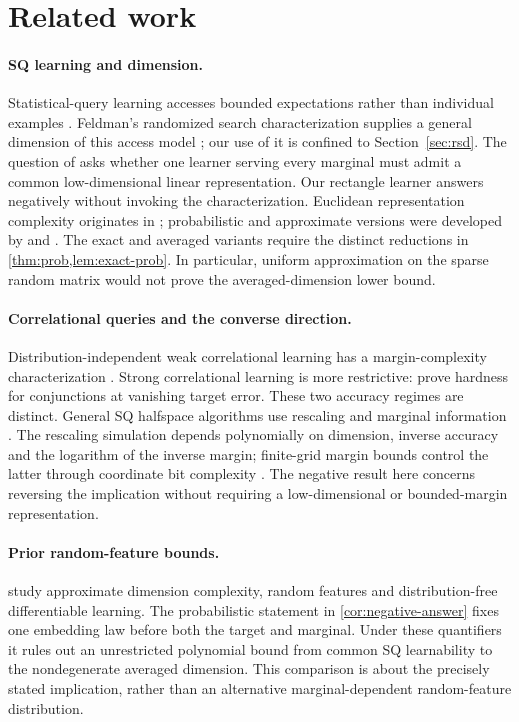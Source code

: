 \section{Related work}\label{sec:related}
\paragraph{SQ learning and dimension.}
Statistical-query learning accesses bounded expectations rather than individual examples \citep{Kearns98}. Feldman's randomized search characterization supplies a general dimension of this access model \citep{Feldman17}; our use of it is confined to Section~\ref{sec:rsd}. The question of \citet{FKS26} asks whether one learner serving every marginal must admit a common low-dimensional linear representation. Our rectangle learner answers negatively without invoking the characterization. Euclidean representation complexity originates in \citet{BDES02}; probabilistic and approximate versions were developed by \citet{CMW25} and \citet{KMS20}. The exact and averaged variants require the distinct reductions in \cref{thm:prob,lem:exact-prob}. In particular, uniform approximation on the sparse random matrix would not prove the averaged-dimension lower bound.

\paragraph{Correlational queries and the converse direction.}
Distribution-independent weak correlational learning has a margin-complexity characterization \citep{Feldman08,Feldman11}. Strong correlational learning is more restrictive: \citet{Feldman11} prove hardness for conjunctions at vanishing target error. These two accuracy regimes are distinct. General SQ halfspace algorithms use rescaling and marginal information \citep{DV04,BF13}. The rescaling simulation depends polynomially on dimension, inverse accuracy and the logarithm of the inverse margin; finite-grid margin bounds control the latter through coordinate bit complexity \citep{GSS13}. The negative result here concerns reversing the implication without requiring a low-dimensional or bounded-margin representation.

\paragraph{Prior random-feature bounds.}
\citet{KM25} study approximate dimension complexity, random features and distribution-free differentiable learning. The probabilistic statement in \cref{cor:negative-answer} fixes one embedding law before both the target and marginal. Under these quantifiers it rules out an unrestricted polynomial bound from common SQ learnability to the nondegenerate averaged dimension. This comparison is about the precisely stated implication, rather than an alternative marginal-dependent random-feature distribution.

